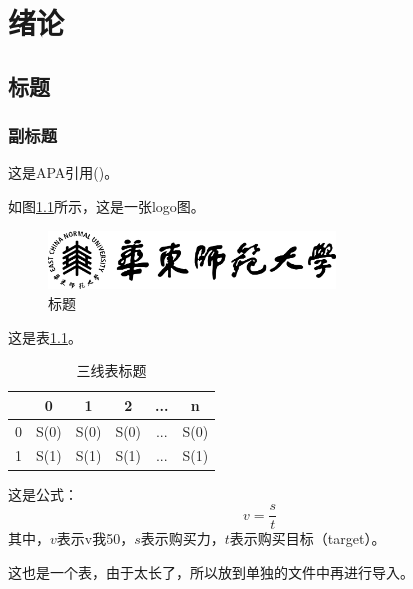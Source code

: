 \raggedbottom
 \setlength{\parskip}{0.5em}
\chapter{绪论}


\section{标题}
\subsection{副标题}

这是APA引用(\cite{pargament_apa_2013})。

如图\ref{fig1}所示，这是一张logo图。

\begin{figure}[!htb]
	\centering
	\includegraphics[width=3in]{1_figures/logo.png}
	\caption{标题}
	\label{fig1}
\end{figure}


这是表\ref{table_example}。
\begin{table}[!htb]
    \caption{三线表标题}
    \label{table_example}
    \centering
    \begin{tabular}{cccccc}
        \hline
        &	0 &	1	& 2 &	...&	n	\\
                \hline
0&	S(0)	&S(0)	&S(0)&	...	&S(0)	\\
1&	S(1)	&S(1)	&S(1)&	...	&S(1)	\\	
        \hline
    \end{tabular}
\end{table}

这是公式：
$$
v=\frac{s}{t}
$$
其中，$v$表示v我50，$s$表示购买力，$t$表示购买目标（target）。


这也是一个表，由于太长了，所以放到单独的文件中再进行导入。


